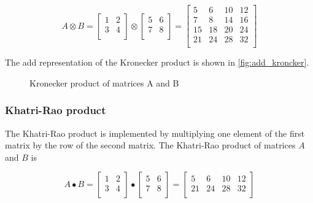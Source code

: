 \[
    A \otimes B = \begin{bmatrix}
                      1 & 2 \\
                      3 & 4 \\
    \end{bmatrix} \otimes \begin{bmatrix}
                              5 & 6 \\
                              7 & 8 \\
    \end{bmatrix} = \begin{bmatrix}
                        5  & 6  & 10 & 12 \\
                        7  & 8  & 14 & 16 \\
                        15 & 18 & 20 & 24 \\
                        21 & 24 & 28 & 32 \\
    \end{bmatrix}
\]

The \gls{add} representation of the Kronecker product is shown in \autoref{fig:add_kroncker}.

\begin{figure*}
    \centering
    
    \caption{Kronecker product of matrices A and B}
    \label{fig:add_kroncker}
\end{figure*}

\subsubsection{Khatri-Rao product}
The Khatri-Rao product is implemented by multiplying one element of the first matrix by the row of the second matrix.
The Khatri-Rao product of matrices $A$ and $B$ is

\[
    A \bullet B = \begin{bmatrix}
                      1 & 2 \\
                      3 & 4 \\
    \end{bmatrix} \bullet \begin{bmatrix}
                              5 & 6 \\
                              7 & 8 \\
    \end{bmatrix} = \begin{bmatrix}
                        5  & 6  & 10 & 12 \\
                        21 & 24 & 28 & 32 \\
    \end{bmatrix}
\]

